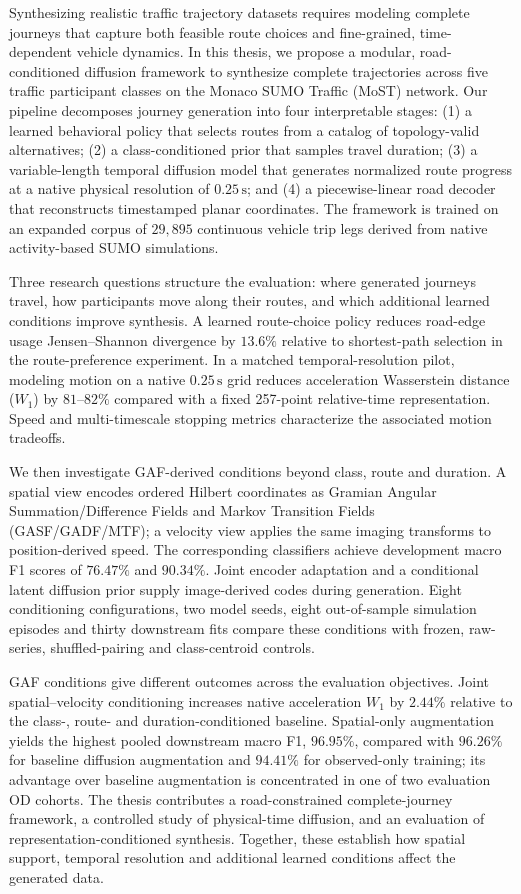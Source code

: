 Synthesizing realistic traffic trajectory datasets requires modeling complete journeys that capture both feasible route choices and fine-grained, time-dependent vehicle dynamics. In this thesis, we propose a modular, road-conditioned diffusion framework to synthesize complete trajectories across five traffic participant classes on the Monaco SUMO Traffic (MoST) network. Our pipeline decomposes journey generation into four interpretable stages: (1) a learned behavioral policy that selects routes from a catalog of topology-valid alternatives; (2) a class-conditioned prior that samples travel duration; (3) a variable-length temporal diffusion model that generates normalized route progress at a native physical resolution of $0.25\,\text{s}$; and (4) a piecewise-linear road decoder that reconstructs timestamped planar coordinates. The framework is trained on an expanded corpus of $29,895$ continuous vehicle trip legs derived from native activity-based SUMO simulations.

Three research questions structure the evaluation: where generated journeys travel, how participants move along their routes, and which additional learned conditions improve synthesis. A learned route-choice policy reduces road-edge usage Jensen--Shannon divergence by $13.6\%$ relative to shortest-path selection in the route-preference experiment. In a matched temporal-resolution pilot, modeling motion on a native $0.25\,\text{s}$ grid reduces acceleration Wasserstein distance ($W_1$) by $81\text{--}82\%$ compared with a fixed 257-point relative-time representation. Speed and multi-timescale stopping metrics characterize the associated motion tradeoffs.

We then investigate GAF-derived conditions beyond class, route and duration. A spatial view encodes ordered Hilbert coordinates as Gramian Angular Summation/Difference Fields and Markov Transition Fields (GASF/GADF/MTF); a velocity view applies the same imaging transforms to position-derived speed. The corresponding classifiers achieve development macro F1 scores of $76.47\%$ and $90.34\%$. Joint encoder adaptation and a conditional latent diffusion prior supply image-derived codes during generation. Eight conditioning configurations, two model seeds, eight out-of-sample simulation episodes and thirty downstream fits compare these conditions with frozen, raw-series, shuffled-pairing and class-centroid controls.

GAF conditions give different outcomes across the evaluation objectives. Joint spatial--velocity conditioning increases native acceleration $W_1$ by $2.44\%$ relative to the class-, route- and duration-conditioned baseline. Spatial-only augmentation yields the highest pooled downstream macro F1, $96.95\%$, compared with $96.26\%$ for baseline diffusion augmentation and $94.41\%$ for observed-only training; its advantage over baseline augmentation is concentrated in one of two evaluation OD cohorts. The thesis contributes a road-constrained complete-journey framework, a controlled study of physical-time diffusion, and an evaluation of representation-conditioned synthesis. Together, these establish how spatial support, temporal resolution and additional learned conditions affect the generated data.
